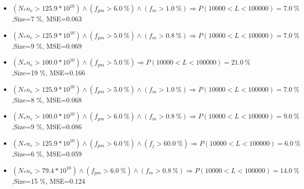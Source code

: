 \documentclass[numbered]{CSL}
\begin{document}
\begin{itemize}
\item $(N_* n_e > 125.9 * 10^{10}) \land (f_{pm} > 6.0~\%) \land (f_m > 1.0~\%) \Rightarrow P(10 000 < L < 100 000) = 7.0~\%$,\hfill Size=7 \%, MSE=0.063
\item $(N_* n_e > 125.9 * 10^{10}) \land (f_{pm} > 5.0~\%) \land (f_m > 0.8~\%) \Rightarrow P(10 000 < L < 100 000) = 7.0~\%$,\hfill Size=9 \%, MSE=0.069
\item $(N_* n_e > 100.0 * 10^{10}) \land (f_{pm} > 5.0~\%) \Rightarrow P(10 000 < L < 100 000) = 21.0~\%$,\hfill Size=19 \%, MSE=0.166
\item $(N_* n_e > 125.9 * 10^{10}) \land (f_{pm} > 5.0~\%) \land (f_m > 1.0~\%) \Rightarrow P(10 000 < L < 100 000) = 7.0~\%$,\hfill Size=8 \%, MSE=0.068
\item $(N_* n_e > 100.0 * 10^{10}) \land (f_{pm} > 6.0~\%) \land (f_m > 0.8~\%) \Rightarrow P(10 000 < L < 100 000) = 9.0~\%$,\hfill Size=9 \%, MSE=0.086
\item $(N_* n_e > 125.9 * 10^{10}) \land (f_{pm} > 6.0~\%) \land (f_j > 60.0~\%) \Rightarrow P(10 000 < L < 100 000) = 6.0~\%$,\hfill Size=6 \%, MSE=0.059
\item $(N_* n_e > 79.4 * 10^{10}) \land (f_{pm} > 6.0~\%) \land (f_m > 0.8~\%) \Rightarrow P(10 000 < L < 100 000) = 14.0~\%$,\hfill Size=15 \%, MSE=0.124
\end{itemize}
\end{document}
